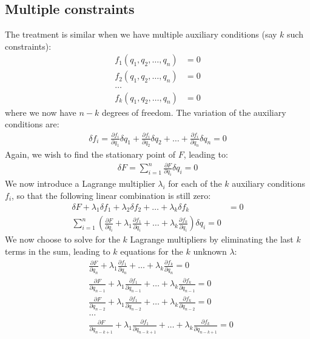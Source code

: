 \subsection{Multiple constraints}
The treatment is similar when we have multiple auxiliary conditions (say $k$ such constraints):
\begin{align}
f_1(q_1, q_2, \dots, q_n)&=0\nonumber\\
f_2(q_1, q_2, \dots, q_n)&=0\nonumber\\
\dots\nonumber\\
f_k(q_1, q_2, \dots, q_n)&=0
\end{align}
where we now have $n-k$ degrees of freedom. The variation of the auxiliary conditions are:
\begin{align}
\delta f_i=\frac{\partial f_i}{\partial q_1}\delta q_1 + \frac{\partial f_i}{\partial q_2}\delta q_2 +\dots+\frac{\partial f_i}{\partial q_n}\delta q_n=0
\end{align}
Again, we wish to find the stationary point of $F$, leading to:
\begin{align}
\delta F = \sum_{i=1}^{n}\frac{\partial F}{\partial q_i}\delta q_i=0
\end{align}
We now introduce a Lagrange multiplier $\lambda_i$ for each of the $k$ auxiliary conditions $f_i$, so that the following linear combination is still zero:
\begin{align}
\label{eqn:multilagrangemulti}
\delta F + \lambda_1 \delta f_1 +\lambda_2 \delta f_2 +\dots+\lambda_k \delta f_k&=0\nonumber\\
\sum_{i=1}^{n}\left(\frac{\partial F}{\partial q_i}+\lambda_1 \frac{\partial f_1}{\partial q_i}+\dots +\lambda_k \frac{\partial f_k}{\partial q_i}\right)\delta q_i=0
\end{align}
We now choose to solve for the $k$ Lagrange multipliers by eliminating the last $k$ terms in the sum, leading to $k$ equations for the $k$ unknown $\lambda$:
\begin{align}
\label{eqn:multilagrangemulti2}
&\frac{\partial F}{\partial q_n}+\lambda_1 \frac{\partial f_1}{\partial q_n}+\dots +\lambda_k \frac{\partial f_k}{\partial q_n}=0\nonumber\\
&\frac{\partial F}{\partial q_{n-1}}+\lambda_1 \frac{\partial f_1}{\partial q_{n-1}}+\dots +\lambda_k \frac{\partial f_k}{\partial q_{n-1}}=0\nonumber\\
&\frac{\partial F}{\partial q_{n-2}}+\lambda_1 \frac{\partial f_1}{\partial q_{n-2}}+\dots +\lambda_k \frac{\partial f_k}{\partial q_{n-2}}=0\nonumber\\
&\dots \nonumber\\
&\frac{\partial F}{\partial q_{n-k+1}}+\lambda_1 \frac{\partial f_1}{\partial q_{n-k+1}}+\dots +\lambda_k \frac{\partial f_k}{\partial q_{n-k+1}}=0
\end{align}
